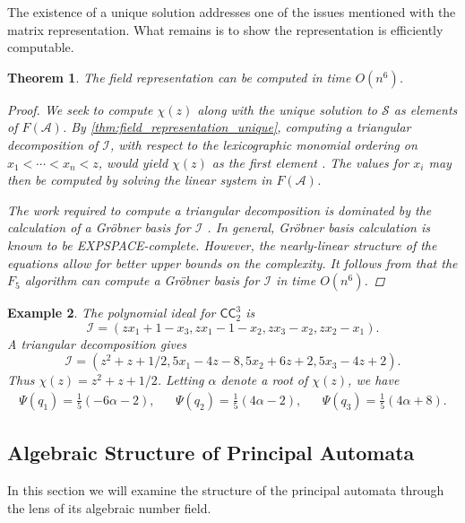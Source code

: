 \documentclass[12pt, letterpaper]{article}
\newcommand{\paren}[1]{\left(#1\right)}
\newcommand{\A}{\mathcal A}
\newcommand{\CC}{\mathsf{CC}}
\newcommand{\I}{\mathcal I}
\renewcommand{\S}{\mathcal S}
\newtheorem{thm}{Theorem}[section]
\newtheorem{example}[thm]{Example}
\begin{document}
The existence of a unique solution addresses one of the issues mentioned with
the matrix representation. What remains is to show the representation is
efficiently computable.

\begin{thm}\label{thm:field_representation_efficient}
    The field representation can be computed in time $O(n^6)$.
    \begin{proof}
        We seek to compute $\chi(z)$ along with the unique solution to $\S$ as
        elements of $F(\A)$. By \cref{thm:field_representation_unique},
        computing a triangular decomposition of $\I$, with respect to the
        lexicographic monomial ordering on $x_1 < \cdots < x_n < z$, would
        yield $\chi(z)$ as the first element \cite{LAZARD1992117}.  The values
        for $x_i$ may then be computed by solving the linear system in $F(\A)$.

        The work required to compute a triangular decomposition is dominated by
        the calculation of a Gr\"obner basis for $\I$ \cite{LAZARD1992117}.  In
        general, Gr\"obner basis calculation is known to be EXPSPACE-complete.
        However, the nearly-linear structure of the equations allow for better
        upper bounds on the complexity. It follows from
        \cite{faugere2011grobner} that the $F_5$ algorithm can compute a
        Gr\"obner basis for $\I$ in time $O(n^6)$.
    \end{proof}
\end{thm}

\begin{example}\label{example:field-cc-3-2}
    The polynomial ideal for $\CC^3_2$ is
    \[
        \I = (zx_1 + 1 - x_3, zx_1 - 1 - x_2, zx_3 - x_2, z x_2 - x_1).
    \]
    A triangular decomposition gives
    \[
        \I = (z^2 + z + 1/2, 5x_1 - 4z - 8, 5x_2 + 6z + 2, 5x_3 - 4z + 2).
    \]
    Thus $\chi(z) = z^2 + z + 1/2$. Letting $\alpha$ denote a root of
    $\chi(z)$, we have
    \begin{align*}
        \Psi(q_1) = \frac{1}{5}\paren{-6 \alpha - 2},
        &&
        \Psi(q_2) = \frac{1}{5}\paren{4 \alpha - 2},
        &&
        \Psi(q_3) = \frac{1}{5}\paren{4 \alpha + 8}.
    \end{align*}
\end{example}

\subsection{Algebraic Structure of Principal Automata}\label{sec:field-principal}
In this section we will examine the structure of the principal automata
through the lens of its algebraic number field.
\end{document}
